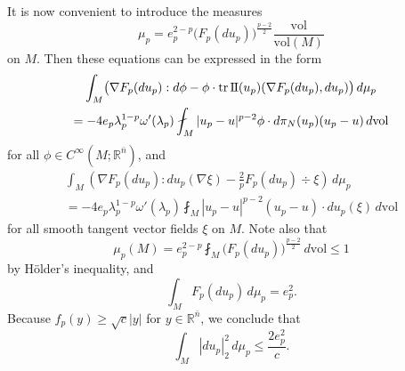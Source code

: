 \documentclass[10pt,a4paper]{amsart}
\newcommand{\R}{\mathbb{R}}
\newcommand{\vol}{\mathrm{vol}}
\newcommand{\ndim}{{\bar{n}}}
\newcommand{\sff}{\mathrm{I{\mkern -1mu}I}}
\DeclareMathOperator{\tr}{tr}
\begin{document}
It is now convenient to introduce the measures
\[
\mu_p = e_p^{2 - p} \bigl(F_p(du_p)\bigr)^{\frac{p - 2}{2}} \frac{\vol}{\vol(M)}
\]
on $M$. Then these equations can be expressed in the form
\begin{multline} \label{eq:Euler-Lagrange-L}
\int_M \bigl(\nabla F_p(du_p) : d\phi - \phi \cdot \tr \sff(u_p)(\nabla F_p(du_p), du_p)\bigr) \, d\mu_p \\
= - 4 e_p \lambda_p^{1 - p} \omega'(\lambda_p) \fint_M |u_p - u|^{p - 2} \phi \cdot d\pi_N(u_p)(u_p - u) \, d\vol
\end{multline}
for all $\phi \in C^\infty(M; \R^\ndim)$, and
\begin{multline} \label{eq:inner-variations-L}
\int_M \left(\nabla F_p(du_p) : du_p(\nabla \xi) - \frac{2}{p} F_p(du_p) \div \xi\right) \, d\mu_p \\
= - 4e_p \lambda_p^{1 - p} \omega'(\lambda_p) \fint_M |u_p - u|^{p - 2} (u_p - u) \cdot du_p(\xi) \, d\vol
\end{multline}
for all smooth tangent vector fields $\xi$ on $M$.
Note also that
\[
\mu_p(M) = e_p^{2 - p} \fint_M \bigl(F_p(du_p)\bigr)^{\frac{p - 2}{2}} \, d\vol \le 1
\]
by H\"older's inequality, and
\[
\int_M F_p(du_p) \, d\mu_p = e_p^2.
\]
Because $f_p(y) \ge \sqrt{c}|y|$ for $y \in \R^\ndim$, we conclude that
\[
\int_M |du_p|_2^2 \, d\mu_p \le \frac{2e_p^2}{c}.
\]
\end{document}
